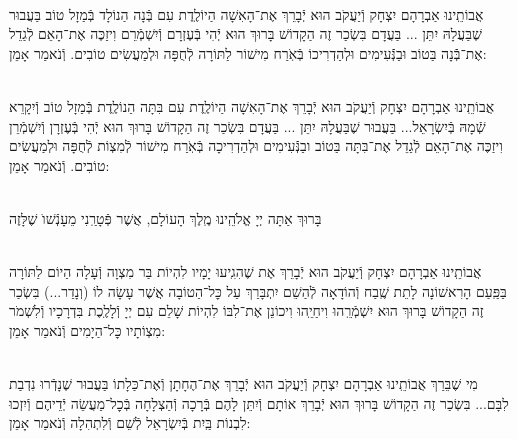 \documentclass[twoside, openany, parskip=half, 11pt]{book}
\begin{document}
\begin{sometimes}



\\
אֲבוֹתֵֽינוּ אַבְרָהָם יִצְחָק וְֿיַעֲקֹב הוּא יְֿבָרֵךְ אֶת־הָאִשָׁה הַיוֹלֶֽדֶת
 עִם בְּֿנָה הַנוֹלָד בְּֿמַזָל טוֹב בַּעֲבוּר שֶׁבַּעֲלָהּ יִתֵּן ... בַּעֲדָם בִּשְׂכַר זֶה הַקָדוֹשׁ בָּרוּךְ הוּא יְֿהִי בְּֿעֶזְרָם וְֿיִשְׁמְֿרֵם וִיזַכֶּה אֶת־הָאֵם לְֿגַדֵל אֶת־בְּֿֿנָה בַּטוֹב וּבַנְּֿֿעִימִים וּלְהַדְרִיכוֹ בְּֿאֹֽרַח מִישׁוֹר לַתּוֹרָה לְֿחֻפָּה וּלְמַעֲשִׂים טוֹבִים. וְֿנֹאמַר אָמֵן:



\\
 אֲבוֹתֵֽינוּ אַבְרָהָם יִצְחָק וְֿיַעֲקֹב הוּא יְֿבָרֵךְ אֶת־הָאִשָׁה הַיוֹלֶֽדֶת
 עִם בִּתָּה הַנוֹלֶֽדֶת בְּֿמַזָל טוֹב וְֿיִקָרֵא שְֿׁמָהּ בְּֿיִשְׂרָאֵל... בַּעֲבוּר שֶׁבַּעֲלָהּ יִתֵּן ... בַּעֲדָם בִּשְׂכַר זֶה הַקָדוֹשׁ בָּרוּךְ הוּא יְֿהִי בְּֿעֶזְרָן וְֿיִשְׁמְֿרֵן וִיזַכֶּה אֶת־הָאֵם לְֿגַדֵל אֶת־בִּתָּה בַּטוֹב ובַנְּֿֿעִימִים וּלְהַדְרִיכָה בְּֿאֹֽרַח מִישׁוֹר לְֿמִצְוֹת לְֿחֻפָּה וּלְמַעֲשִׂים טוֹבִים. וְֿנֹאמַר אָמֵן:

\\
 בָּרוּךְ אַתָּה יְיָ אֱלֹהֵֽינוּ מֶֽלֶךְ הָעוֹלָם, אֲשֶׁר פְּֿטָרַֽנִי מֵעָנְֿשׁוׂ שֶׁלָּזֶה

\\
אֲבוֹתֵֽינוּ אַבְרָהָם יִצְחָק וְֿיַעֲקֹב הוּא יְֿבָרֵךְ אֶת
 שֶׁהִגִֽיעוּ יָמָיו לִהְיוֹת בַּר מִצְוָה וְֿעָלָה הַיוֹם לַתּוֹרָה בַּפַּֽעַם הָרִאשׁוֹנָה לָתֵת שֶֽׁבַח וְֿהוֹדָאָה לְֿהַשֵׁם יִתְבָּרַךְ עַל כׇּל־הַטוֹבָה אֲשֶׁר עָשָׂה לוֹ (וְנָדַר...) בִּשְׂכַר זֶה הַקָדוֹשׁ בָּרוּךְ הוּא יִשְׁמְֿרֵֽהוּ וִיחַיֵֽהוּ וִיכוֹנֵן אֶת־לִבּוֹ לִהְיוֹת שָׁלֵם עִם יְיָ וְֿלָלֶֽכֶת בִּדְרָכָיו וְֿלִשְׁמֹר מִצְוֹתָיו כׇּל־הַיָמִים וְֿנֹאמַר אָמֵן:


\\
מִי שֶׁבֵּרַךְ אֲבוֹתֵֽינוּ אַבְרָהָם יִצְחָק וְֿיַעֲקֹב הוּא יְֿבָרֵךְ אֶת־הֶחָתָן  וְֿאֶת־כַּלָתוֹ בַּעֲבוּר שֶׁנָדְֿרוּ נִדְבַת לִבָּם... בִּשְׂכַר זֶה הַקָדוֹשׁ בָּרוּךְ הוּא יְֿבָרֵךְ אוֹתָם וְֿיִתֵּן לָהֶם בְּֿרָכָה וְֿהַצְלָחָה בְּֿכׇל־מַעֲשֵׂה יְֿדֵיהֶם וְֿיִזְכוּ לִבְנוֹת בַּֽיִת בְּֿיִשְׂרָאֵל לְֿשֵׁם וְֿלִתְהִלָה וְֿנֹאמַר אָמֵן:


\end{sometimes}
\end{document}
